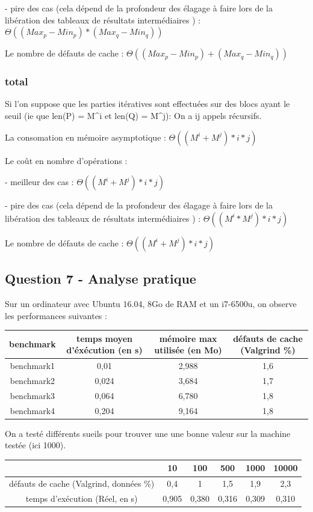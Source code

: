 \documentclass[paper=a4, fontsize=11pt]{scrartcl} %
\begin{document}
- pire des cas (cela dépend de la profondeur des élagage à faire lors de la libération des tableaux de résultats intermédiaires ) : $\Theta((Max_p - Min_p) * (Max_q - Min_q))$

Le nombre de défauts de cache : $\Theta((Max_p - Min_p) + (Max_q - Min_q))$

\subsubsection{total}
Si l'on suppose que les parties itératives sont effectuées sur des blocs ayant le seuil (ie que len(P) = M^i et len(Q) = M^j): On a ij appels récursifs.

La consomation en mémoire asymptotique : $ \Theta((M^i + M^j)*i*j)$

Le coût en nombre d'opérations :

- meilleur des cas : $\Theta((M^i + M^j)*i*j)$

- pire des cas (cela dépend de la profondeur des élagage à faire lors de la libération des tableaux de résultats intermédiaires ) : $\Theta((M^i * M^j)*i*j)$

Le nombre de défauts de cache : $\Theta((M^i + M^j)*i*j)$


\subsection*{Question 7 - Analyse pratique}

Sur un ordinateur avec Ubuntu 16.04, 8Go de RAM et un i7-6500u, on observe les performances suivantes :

\begin{tabular}{ | c | c | c | c |}
    \hline
        benchmark& temps moyen d'éxécution (en s)& mémoire max utilisée (en Mo) & défauts de cache (Valgrind \%)\\ \hline\hline
        benchmark1 & 0,01 & 2,988 & 1,6\\ \hline
        benchmark2 & 0,024 & 3,684 & 1,7\\ \hline
        benchmark3 & 0,064 & 6,780 & 1,8\\ \hline
        benchmark4 & 0,204 & 9,164 & 1,8\\
    \hline
 \end{tabular}

 On a testé différents sueils pour trouver une une bonne valeur sur la machine testée (ici 1000).

\begin{tabular}{ | c | c | c | c | c | c | }
 \hline
     & 10 & 100 & 500 & 1000 & 10000\\ \hline
     défauts de cache (Valgrind, données \%) & 0,4 & 1 & 1,5 & 1,9 & 2,3\\ \hline
     temps d'exécution (Réel, en s) & 0,905 & 0,380 & 0,316 & 0,309 & 0,310\\
 \hline
\end{tabular}
\end{document}
